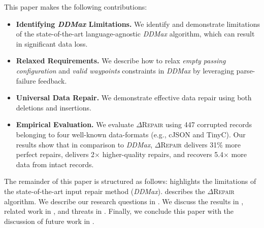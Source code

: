 \documentclass[sigconf,review,anonymous]{acmart}
\newcommand{\dtask}{data repair\xspace}
\newcommand{\approach}{\textsc{$\Delta$Repair}\xspace}
\newcommand{\ddmax}{\textit{DDMax}\xspace}
\newcommand{\drepair}{\approach}
\begin{document}
This paper makes the following
contributions:
\begin{itemize}
\item \textbf{Identifying \ddmax Limitations.}
We identify and demonstrate limitations of 
the state-of-the-art language-agnostic \ddmax algorithm, which can result in significant data loss.
\item \textbf{Relaxed Requirements.} We describe how to relax
\emph{empty passing configuration} and \emph{valid waypoints} constraints in \ddmax by leveraging parse-failure feedback.
\item \textbf{Universal Data Repair.}
We demonstrate effective \dtask using both deletions and insertions.
\item \textbf{Empirical Evaluation.} %
We evaluate \drepair using
447 corrupted records belonging to four well-known data-formats (e.g., cJSON and TinyC). 
Our results show that in comparison to \ddmax,
\drepair delivers 31\% more perfect repairs, %
delivers 2$\times$ higher-quality repairs,  %
and recovers 5.4$\times$ more data from intact records.   %

\end{itemize}

The remainder of this paper is structured as follows: 
 highlights the limitations of the 
state-of-the-art input repair method (\ddmax).
describes the \drepair algorithm. We describe our research questions in
.
We discuss the results in ,
related work in , and threats in .
Finally, we conclude this paper 
with the discussion of future work in . 
\end{document}
